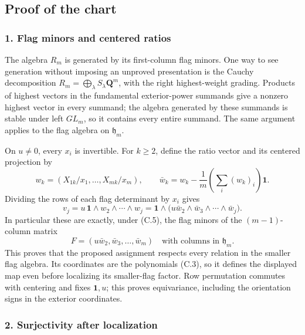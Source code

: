 \documentclass[
  10pt,
]{article}
\begin{document}
\subsection{Proof of the chart}\label{proof-of-the-chart}

\subsubsection{1. Flag minors and centered
ratios}\label{flag-minors-and-centered-ratios}

The algebra \(R_m\) is generated by its first-column flag minors. One
way to see generation without imposing an unproved presentation is the
Cauchy decomposition \(R_m=\bigoplus_\lambda S_\lambda\mathbf Q^m\),
with the right highest-weight grading. Products of highest vectors in
the fundamental exterior-power summands give a nonzero highest vector in
every summand; the algebra generated by these summands is stable under
left \(GL_m\), so it contains every entire summand. The same argument
applies to the flag algebra on \(\mathfrak h_m\).

On \(u\ne0\), every \(x_i\) is invertible. For \(k\ge2\), define the
ratio vector and its centered projection by \[
w_k=(X_{1k}/x_1,\ldots,X_{mk}/x_m),\qquad
\bar w_k=w_k-\frac{1}{m}\left(\sum_i(w_k)_i\right)\mathbf1.
\tag{C.9}
\] Dividing the rows of each flag determinant by \(x_i\) gives \[
v_j=u\,\mathbf1\wedge w_2\wedge\cdots\wedge w_j
=\mathbf1\wedge
\bigl(u\bar w_2\wedge\bar w_3\wedge\cdots\wedge\bar w_j\bigr).
\tag{C.10}
\] In particular these are exactly, under (C.5), the flag minors of the
\((m-1)\)-column matrix \[
F=(u\bar w_2,\bar w_3,\ldots,\bar w_m)
\quad\text{with columns in }\mathfrak h_m.
\tag{C.11}
\] This proves that the proposed assignment respects every relation in
the smaller flag algebra. Its coordinates are the polynomials (C.3), so
it defines the displayed map even before localizing its smaller-flag
factor. Row permutation commutes with centering and fixes
\(\mathbf1,u\); this proves equivariance, including the orientation
signs in the exterior coordinates.

\subsubsection{2. Surjectivity after
localization}\label{surjectivity-after-localization}
\end{document}

